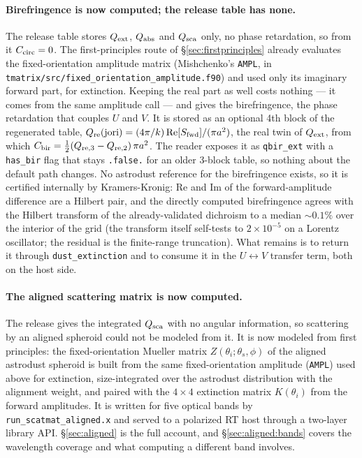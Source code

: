 \documentclass{my_memo}
\newcommand{\code}[1]{\texttt{#1}}
\begin{document}
\paragraph{Birefringence is now computed; the release table has none.} The
release table stores $Q_{\rm ext}$, $Q_{\rm abs}$ and $Q_{\rm sca}$ only, no phase
retardation, so from it $C_{\rm circ}=0$. The first-principles route of
\S\ref{sec:firstprinciples} already evaluates the fixed-orientation amplitude
matrix (Mishchenko's \code{AMPL}, in
\code{tmatrix/src/fixed\_orientation\_amplitude.f90}) and used
only its imaginary forward part, for extinction. Keeping the real part as well
costs nothing --- it comes from the same amplitude call --- and gives the
birefringence, the phase retardation that couples $U$ and $V$. It is stored as an
optional 4th block of the regenerated table, $Q_{\rm re}(\mathrm{jori})=
(4\pi/k)\,\mathrm{Re}[S_{\rm fwd}]/(\pi a^2)$, the real twin of $Q_{\rm ext}$, from
which $C_{\rm bir}=\tfrac12(Q_{{\rm re},3}-Q_{{\rm re},2})\,\pi a^2$. The reader
exposes it as \code{qbir\_ext} with a \code{has\_bir} flag that stays \code{.false.}
for an older 3-block table, so nothing about the default path changes. No astrodust
reference for the birefringence exists, so it is certified internally by
Kramers-Kronig: $\mathrm{Re}$ and $\mathrm{Im}$ of the forward-amplitude difference
are a Hilbert pair, and the directly computed birefringence agrees with the Hilbert
transform of the already-validated dichroism to a median $\sim0.1\%$ over the
interior of the grid (the transform itself self-tests to $2\times10^{-5}$ on a
Lorentz oscillator; the residual is the finite-range truncation). What remains is to
return it through \code{dust\_extinction} and to consume it in the $U\leftrightarrow V$
transfer term, both on the host side.

\paragraph{The aligned scattering matrix is now computed.} The release gives the
integrated $Q_{\rm sca}$ with no angular information, so scattering by an aligned
spheroid could not be modeled from it. It is now modeled from first principles:
the fixed-orientation Mueller matrix $Z(\theta_i;\theta_s,\phi)$ of the aligned
astrodust spheroid is built from the same fixed-orientation amplitude
(\code{AMPL}) used above for extinction, size-integrated over the
astrodust distribution with the alignment weight, and paired with the
$4\times4$ extinction matrix $K(\theta_i)$ from the forward amplitudes. It is
written for five optical bands by \code{run\_scatmat\_aligned.x} and served to a
polarized RT host through a two-layer library API. \S\ref{sec:aligned} is the
full account, and \S\ref{sec:aligned:bands} covers the wavelength coverage and
what computing a different band involves.
\end{document}
